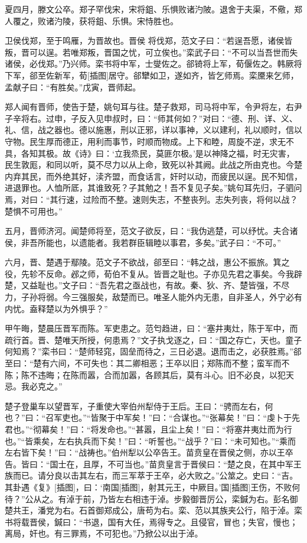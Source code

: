 \documentclass[a4paper,12pt,UTF8,twoside]{ctexbook}
\begin{document}
夏四月，滕文公卒。郑子罕伐宋，宋将鉏、乐惧败诸汋陂。退舍于夫渠，不儆，郑人覆之，败诸汋陵，获将鉏、乐惧。宋恃胜也。

卫侯伐郑，至于鸣雁，为晋故也。晋侯 将伐郑，范文子曰：“若逞吾愿，诸侯皆叛，晋可以逞。若唯郑叛，晋国之忧，可立俟也。”栾武子曰：“不可以当吾世而失诸侯，必伐郑。”乃兴师。栾书将中军，士燮佐之。郤锜将上军，荀偃佐之。韩厥将下军，郤至佐新军，荀[插图]居守。郤犫如卫，遂如齐，皆乞师焉。栾黡来乞师，孟献子曰：“有胜矣。”戊寅，晋师起。

郑人闻有晋师，使告于楚，姚句耳与往。楚子救郑，司马将中军，令尹将左，右尹子辛将右。过申，子反入见申叔时，曰：“师其何如？”对曰：“德、刑、详、义、礼、信，战之器也。德以施惠，刑以正邪，详以事神，义以建利，礼以顺时，信以守物。民生厚而德正，用利而事节，时顺而物成。上下和睦，周旋不逆，求无不具，各知其极。故《诗》曰：‘立我烝民，莫匪尔极。’是以神降之福，时无灾害，民生敦厖，和同以听，莫不尽力以从上命，致死以补其阙。此战之所由克也。今楚内弃其民，而外绝其好，渎齐盟，而食话言，奸时以动，而疲民以逞。民不知信，进退罪也。人恤所厎，其谁致死？子其勉之！吾不复见子矣。”姚句耳先归，子驷问焉，对曰：“其行速，过险而不整。速则失志，不整丧列。志失列丧，将何以战？楚惧不可用也。”

五月，晋师济河。闻楚师将至，范文子欲反，曰：“我伪逃楚，可以纾忧。夫合诸侯，非吾所能也，以遗能者。我若群臣辑睦以事君，多矣。”武子曰：“不可。”

六月，晋、楚遇于鄢陵。范文子不欲战，郤至曰：“韩之战，惠公不振旅。箕之役，先轸不反命。邲之师，荀伯不复从。皆晋之耻也。子亦见先君之事矣。今我辟楚，又益耻也。”文子曰：“吾先君之亟战也，有故。秦、狄、齐、楚皆强，不尽力，子孙将弱。今三强服矣，敌楚而已。唯圣人能外内无患，自非圣人，外宁必有内忧。盍释楚以为外惧乎？”

甲午晦，楚晨压晋军而陈。军吏患之。范匄趋进，曰：“塞井夷灶，陈于军中，而疏行首。晋、楚唯天所授，何患焉？”文子执戈逐之，曰：“国之存亡，天也。童子何知焉？”栾书曰：“楚师轻窕，固垒而待之，三日必退。退而击之，必获胜焉。”郤至曰：“楚有六间，不可失也：其二卿相恶；王卒以旧；郑陈而不整；蛮军而不陈；陈不违晦；在陈而嚣，合而加嚣，各顾其后，莫有斗心。旧不必良，以犯天忌。我必克之。”

楚子登巢车以望晋军，子重使大宰伯州犁侍于王后。王曰：“骋而左右，何也？”曰：“召军吏也。”“皆聚于中军矣！”曰：“合谋也。”“张幕矣！”曰：“虔卜于先君也。”“彻幕矣！”曰：“将发命也。”“甚嚣，且尘上矣！”曰：“将塞井夷灶而为行也。”“皆乘矣，左右执兵而下矣！”曰：“听誓也。”“战乎？”曰：“未可知也。”“乘而左右皆下矣！”曰：“战祷也。”伯州犁以公卒告王。苗贲皇在晋侯之侧，亦以王卒告。皆曰：“国士在，且厚，不可当也。”苗贲皇言于晋侯曰：“楚之良，在其中军王族而已。请分良以击其左右，而三军萃于王卒，必大败之。”公筮之。史曰：“吉。其卦遇《复》[插图]，曰：‘南国[插图]，射其元王，中厥目。’国[插图]王伤，不败何待？”公从之。有淖于前，乃皆左右相违于淖。步毅御晋厉公，栾鍼为右。彭名御楚共王，潘党为右。石首御郑成公，唐苟为右。栾、范以其族夹公行，陷于淖。栾书将载晋侯，鍼曰：“书退，国有大任，焉得专之。且侵官，冒也；失官，慢也；离局，奸也。有三罪焉，不可犯也。”乃掀公以出于淖。
\end{document}
